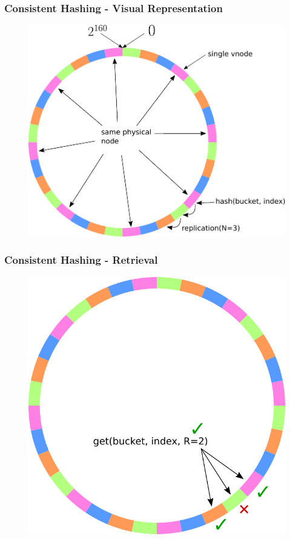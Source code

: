 \documentclass[aspectratio=169]{beamer}
\begin{document}
\begin{frame}
\frametitle{Consistent Hashing - Visual Representation}
\begin{figure}
\includegraphics[height=0.8\textheight]{../images/chash_description}
\end{figure}
\end{frame}

\begin{frame}
\frametitle{Consistent Hashing - Retrieval}
\begin{figure}
\includegraphics[height=0.8\textheight]{chash_retrieval}
\end{figure}
\end{frame}
\end{document}
